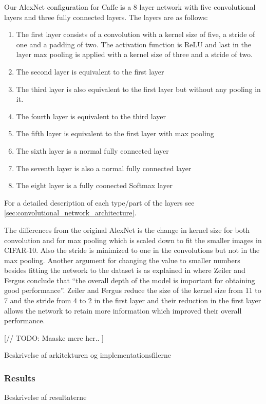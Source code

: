 Our AlexNet configuration for Caffe is a 8 layer network with five convolutional
layers and three fully connected layers. The layers are as follows:
\begin{enumerate}
	\item The first layer consists of a convolution with a kernel size of five, a
	stride of one and a padding of two. The activation function is ReLU and last in
	the layer max pooling is applied with a kernel size of three and a stride of
	two. 
	\item The second layer is equivalent to the first layer 
	\item The third layer is also equivalent to the first layer but without any
	pooling in it. 
	\item The fourth layer is equivalent to the third layer 
	\item The fifth layer is equivalent to the first layer with max pooling  
	\item The sixth layer is a normal fully connected layer
	\item The seventh layer is also a normal fully connected layer
	\item The eight layer is a fully coonected Softmax layer
\end{enumerate}

For a detailed description of each type/part of the layers see
\autoref{sec:convolutional_network_architecture}. 


The differences from the original AlexNet is the change in kernel size for both
convolution and for max pooling which is scaled down to fit the smaller
images in CIFAR-10. Also the stride is minimized to one in the convolutions but
not in the max pooling. Another argument for changing the value to smaller
numbers besides fitting the network to the dataset is as explained in
\cite{ZeilerFergus} where Zeiler and Fergus conclude that ``the overall depth of
the model is important for obtaining good performance''.  Zeiler and
Fergus\cite{ZeilerFergus} reduce the size of the kernel size from 11 to 7 and
the stride from 4 to 2 in the first layer and their reduction in the first layer
allows the network to retain more information which improved their overall
performance. 

[// TODO: Maaske mere her.. ]

Beskrivelse af arkitekturen og implementationsfilerne





\subsubsection{Results}
Beskrivelse af resultaterne


